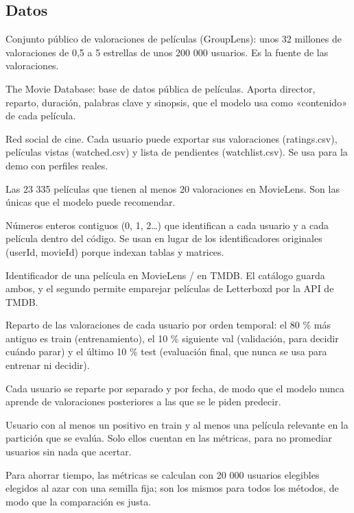 \subsection*{Datos}
\begin{description}\setlength{\itemsep}{2pt}
\item[MovieLens 32M] Conjunto público de valoraciones de películas (GroupLens): unos 32 millones de valoraciones de 0,5 a 5 estrellas de unos 200 000 usuarios. Es la fuente de las valoraciones.
\item[TMDB] The Movie Database: base de datos pública de películas. Aporta director, reparto, duración, palabras clave y sinopsis, que el modelo usa como «contenido» de cada película.
\item[Letterboxd] Red social de cine. Cada usuario puede exportar sus valoraciones (ratings.csv), películas vistas (watched.csv) y lista de pendientes (watchlist.csv). Se usa para la demo con perfiles reales.
\item[Catálogo] Las 23 335 películas que tienen al menos 20 valoraciones en MovieLens. Son las únicas que el modelo puede recomendar.
\item[user\_idx /\allowbreak{} item\_idx] Números enteros contiguos (0, 1, 2…) que identifican a cada usuario y a cada película dentro del código. Se usan en lugar de los identificadores originales (userId, movieId) porque indexan tablas y matrices.
\item[movieId /\allowbreak{} tmdbId] Identificador de una película en MovieLens /\allowbreak{} en TMDB. El catálogo guarda ambos, y el segundo permite emparejar películas de Letterboxd por la API de TMDB.
\item[Partición (train /\allowbreak{} val /\allowbreak{} test)] Reparto de las valoraciones de cada usuario por orden temporal: el 80 \% más antiguo es train (entrenamiento), el 10 \% siguiente val (validación, para decidir cuándo parar) y el último 10 \% test (evaluación final, que nunca se usa para entrenar ni decidir).
\item[Reparto por usuario y tiempo] Cada usuario se reparte por separado y por fecha, de modo que el modelo nunca aprende de valoraciones posteriores a las que se le piden predecir.
\item[Usuario elegible] Usuario con al menos un positivo en train y al menos una película relevante en la partición que se evalúa. Solo ellos cuentan en las métricas, para no promediar usuarios sin nada que acertar.
\item[Submuestra de 20 000 usuarios] Para ahorrar tiempo, las métricas se calculan con 20 000 usuarios elegibles elegidos al azar con una semilla fija; son los mismos para todos los métodos, de modo que la comparación es justa.

\end{description}
